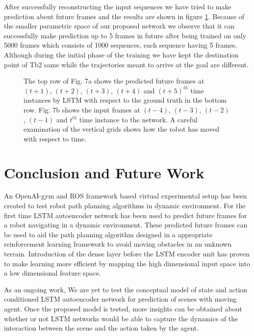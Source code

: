 \documentclass[sigconf]{acmart}
\begin{document}
After successfully reconstructing the input sequences we have tried to make prediction about future frames and the results are shown in figure \ref{fig8}. Because of the smaller parametric space of our proposed network we observe that it can successfully make  prediction up to 5 frames in future after being trained on only 5000 frames which consists of 1000 sequences, each sequence having 5 frames. Although during the initial phase of the training we have kept the destination point of Tb2 same while the trajectories meant to arrive at the goal are different.
    \begin{figure}
        \centering
        \label{fig8a}

        \label{fig8b}
        \caption{The top row of Fig. 7a shows the predicted future frames at $(t+1)$, $(t+2)$, $(t+3)$, $(t+4)$ and $(t+5)^{th}$ time instances by LSTM with respect to the ground truth in the bottom row. Fig. 7b shows the input frames at  $(t-4)$, $(t-3)$, $(t-2)$, $(t-1)$ and $t^{th}$ time instance to the network. A careful examination of the vertical grids shows how the robot has moved with respect to time.}
        \label{fig8}
    \end{figure}\section{Conclusion and Future Work}An OpenAI-gym and ROS framework \cite{openai} based virtual experimental setup has been created to test robot path planning algorithms in dynamic environment. For the first time  LSTM autoencoder network has been used to predict future frames for a robot navigating in a dynamic environment. These predicted future frames can be used to aid the path planning algorithm designed in a appropriate reinforcement learning framework to avoid moving obstacles in an unknown terrain. Introduction of the dense layer before the LSTM encoder unit has proven to make learning more efficient by mapping the high dimensional input space into a low dimensional feature space.

As an ongoing work, We are yet to test the conceptual model of state and action conditioned LSTM autoencoder network for prediction of scenes with moving agent. Once the proposed model is tested, more insights can be obtained about whether or not LSTM networks would be able to capture the dynamics of the interaction between the scene and the action taken by the agent. \\
\end{document}
